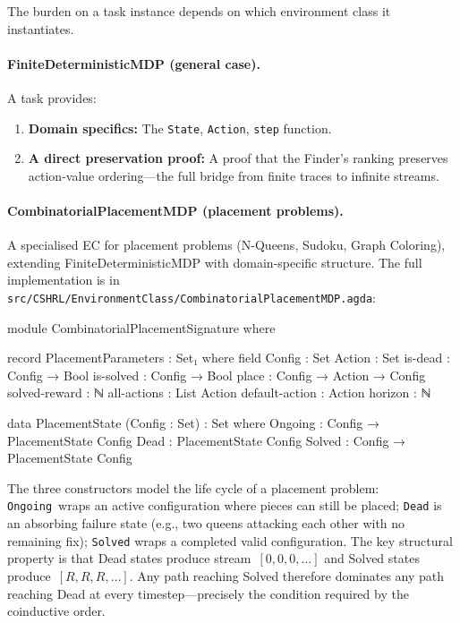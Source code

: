 \documentclass[9pt,a4paper]{article}
\newcommand{\fpath}[1]{\nolinkurl{#1}}
\theoremstyle{plain}
\theoremstyle{definition}
\theoremstyle{remark}
\begin{document}
The burden on a task instance depends on which environment class it instantiates.

\paragraph{FiniteDeterministicMDP (general case).}
A task provides:
\begin{enumerate}
\item \textbf{Domain specifics:} The \texttt{State}, \texttt{Action}, \texttt{step} function.
\item \textbf{A direct preservation proof:} A proof that the Finder's ranking preserves action-value ordering---the full bridge from finite traces to infinite streams.
\end{enumerate}

\paragraph{CombinatorialPlacementMDP (placement problems).}\label{sec:cpmdp}
A specialised EC for placement problems (N-Queens, Sudoku, Graph Coloring), extending FiniteDeterministicMDP with domain-specific structure.  The full implementation is in \fpath{src/CSHRL/EnvironmentClass/CombinatorialPlacementMDP.agda}:

\begin{code}[hide]
module CombinatorialPlacementSignature where
\end{code}

\begin{code}
  record PlacementParameters : Set₁ where
    field
      Config : Set
      Action : Set
      is-dead   : Config → Bool
      is-solved : Config → Bool
      place : Config → Action → Config
      solved-reward : ℕ
      all-actions : List Action
      default-action : Action
      horizon : ℕ

  data PlacementState (Config : Set) : Set where
    Ongoing : Config → PlacementState Config
    Dead    : PlacementState Config
    Solved  : Config → PlacementState Config
\end{code}

\noindent The three constructors model the life cycle of a placement problem: \texttt{Ongoing}~wraps an active configuration where pieces can still be placed; \texttt{Dead} is an absorbing failure state (e.g., two queens attacking each other with no remaining fix); \texttt{Solved} wraps a completed valid configuration.  The key structural property is that Dead states produce stream~$[0, 0, 0, \ldots]$ and Solved states produce~$[R, R, R, \ldots]$.  Any path reaching Solved therefore dominates any path reaching Dead at every timestep---precisely the condition required by the coinductive order.
\end{document}
